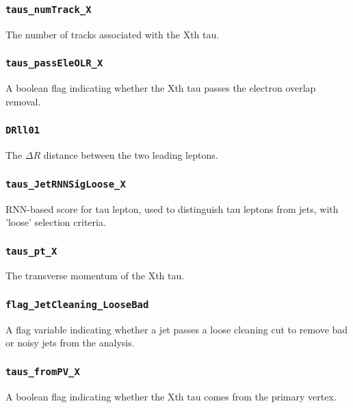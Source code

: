 \subsubsection{\texttt{taus\_numTrack\_X}} The number of tracks associated with the Xth tau.

\subsubsection{\texttt{taus\_passEleOLR\_X}} A boolean flag indicating whether the Xth tau passes the electron overlap
removal.

\subsubsection{\texttt{DRll01}} The $\Delta R$ distance between the two leading leptons.

\subsubsection{\texttt{taus\_JetRNNSigLoose\_X}} RNN-based score for tau lepton, used to distinguish tau leptons from
jets, with 'loose' selection criteria.

\subsubsection{\texttt{taus\_pt\_X}} The transverse momentum of the Xth tau.


\subsubsection{\texttt{flag\_JetCleaning\_LooseBad}} A flag variable indicating whether a jet passes a loose cleaning cut
to remove bad or noisy jets from the analysis.

\subsubsection{\texttt{taus\_fromPV\_X}} A boolean flag indicating whether the Xth tau comes from the primary vertex.

